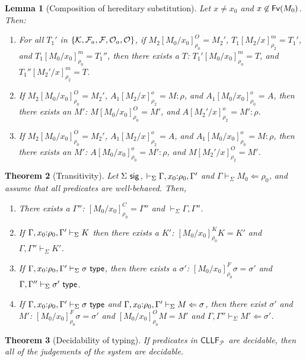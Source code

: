 \documentclass[submission,copyright,creativecommons]{eptcs}
\theoremstyle{plain}
\newtheorem{theorem}{Theorem}[section]
\newtheorem{lemma}[theorem]{Lemma}
\theoremstyle{definition}
\newcommand{\CLLFP} {\mbox{$\mathsf{CLLF}_{\mathcal P}$}}
\newcommand {\VDASHS} {\vdash_\Sigma} \newcommand {\VDASHO} {\vdash_\Omega} \newcommand {\VDASHCBV} {\vdash_{\Sigma_{{CBV}}}} \newcommand {\VDASHSIMP} {\vdash_{\Sigma_{{Imp}}}} \newcommand {\VDASHSHOARE} {\vdash_{\Sigma_{{Hoare}}}} \newcommand {\VDASHSERASE} {\vdash_{\Sigma^\Erase}}    \newcommand {\VDASHEAL} {\vdash_{EAL}} \newcommand {\VDASHSEAL} {\vdash_{\Sigma_{{EAL}}}} \newcommand {\VDASHFP} {\vdash_{\sf FPST}}
\renewcommand {\L} {\mathcal{L}} \newcommand   {\C} {\mathcal{C}} \newcommand   {\T} {\mathcal{T}} \newcommand   {\U} {\mathcal{U}}
\newcommand{\Erase} {{-\U\L}}
\begin{document}
\begin{lemma}[Composition of hereditary substitution]
  Let $x\neq x_0$ and $x\not\in {\mathsf {Fv}}(M_0)$. Then:\vspace{-0.5ex}

  \begin{enumerate}
  \setlength\itemsep{-0.3ex}
\item For all $T_1'$ in $\{{\mathcal K},{\mathcal{F}_a},{\mathcal F},{\mathcal{O}_a},{\mathcal O}\}$, if
  $M_2[M_0/x_0]^O_{\rho_0}=M_2'$, $T_1[M_2/x]^m_{\rho_2} = T_1'$, and
  $T_1[M_0/x_0]^m_{\rho_0} = T_1''$, then there exists a $T$:
  $T_1'[M_0/x_0]^m_{\rho_0} = T$, and $T_1''[M_2'/x]^m_{\rho_2}=T$.
  \item If $M_2[M_0/x_0]^O_{\rho_0}=M_2'$,
    $A_1[M_2/x]^o_{\rho_2}=M : \rho$, and $A_1[M_0/x_0]^o_{\rho_0}=A$,
    then there exists an $M'$: $M[M_0/x_0]^O_{\rho_0}=M'$,
    and $A[M_2'/x]^o_{\rho_2}=M' : \rho$.
  \item If $M_2[M_0/x_0]^O_{\rho_0}=M_2'$, $A_1[M_2/x]^o_{\rho_2}=A$,
    and $A_1[M_0/x_0]^o_{\rho_0}=M : \rho$, then there exists an $M'$:
    $A[M_0/x_0]^o_{\rho_0}=M' : \rho$, and
    $M[M_2'/x]^O_{\rho_2}=M'$.
    \end{enumerate}
\end{lemma}


\begin{theorem}[Transitivity]
  Let $ \Sigma\ {\mathsf {sig}} $, $ \VDASHS \Gamma, x_0\of \rho_0, \Gamma'$ and
  $\Gamma \VDASHS M_0 \Leftarrow \rho_0$, and assume that all
  predicates are well-behaved. Then,\vspace{-0.5ex}

  \begin{enumerate}
  \setlength\itemsep{-0.3ex}
  \item There exists a $\Gamma''$: $[M_0/x_0]_{\rho_0}^{C}=
    \Gamma''$ and $\VDASHS \Gamma, \Gamma''$.
  \item If $\Gamma, x_0\of \rho_0, \Gamma' \VDASHS K$ then there
    exists a $K'$: $[M_0/x_0]^K_{\rho_0}K=K'$ and $\Gamma,
    \Gamma'' \VDASHS K'$.
  \item If $\Gamma, x_0\of \rho_0, \Gamma' \VDASHS \sigma \ \Type$,
    then there exists a $\sigma'$:
    $[M_0/x_0]^F_{\rho_0}\sigma=\sigma'$ and $\Gamma, \Gamma''
    \VDASHS \sigma'\ \Type$.
  \item If $\Gamma, x_0\of \rho_0, \Gamma' \VDASHS \sigma \ \Type$
    and $\Gamma, x_0\of \rho_0, \Gamma' \VDASHS M \Leftarrow
    \sigma$, then there exist $\sigma'$ and $M'$:
    $[M_0/x_0]^F_{\rho_0}\sigma=\sigma'$ and
    $[M_0/x_0]^O_{\rho_0}M=M'$ and $\Gamma, \Gamma'' \VDASHS M'
    \Leftarrow \sigma'$.
  \end{enumerate}
\end{theorem}
\begin{theorem}[Decidability of typing]
  \label{thm:dectypcllf}
  If predicates in \CLLFP\ are decidable, then all of the judgements
  of the system are decidable.\vspace{-1ex}
\end{theorem}
\end{document}
